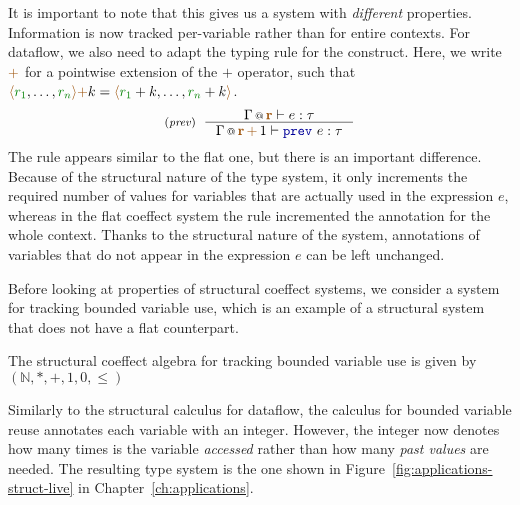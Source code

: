 It is important to note that this gives us a system with \emph{different} properties.
Information is now tracked per-variable rather than for entire contexts. For dataflow,
we also need to adapt the typing rule for the  construct. Here, we write $\aclrd{+}$
for a pointwise extension of the $+$ operator, such that
$\alift{\cclrd{r_1}, \ldots, \cclrd{r_n}} \aclrd{+} k = \alift{\cclrd{r_1} + k, \ldots, \cclrd{r_n} + k}$.
%
\begin{equation*}
\tyrule{prev}
  { \coctx{\Gamma}{\aclrd{\textbf{r}}} \vdash e : \tau }
  { \coctx{\Gamma}{\aclrd{\textbf{r}} \,\aclrd{+}\, 1} \vdash \kvd{prev}~e : \tau }
\end{equation*}
%
The rule appears similar to the flat one, but there is an important difference. Because of the
structural nature of the type system, it only increments the required number of values for
variables that are actually used in the expression $e$, whereas in the flat coeffect system the rule
incremented the annotation for the whole context. Thanks to the structural nature of the system,
annotations of variables that do not appear in the expression $e$ can be left unchanged.

Before looking at properties of structural coeffect systems,
we consider a system for tracking bounded variable use, which is an example of a structural system
that does not have a flat counterpart.

\begin{example}
\label{ex:structural-ex-bll}
The structural coeffect algebra for tracking bounded variable use is given by
$(\mathbb{N}, \ast, +, 1, 0, \leq)$
\end{example}

\noindent
Similarly to the structural calculus for dataflow, the calculus for bounded variable reuse
annotates each variable with an integer. However, the integer now denotes how many times is the variable
\emph{accessed} rather than how many \emph{past values} are needed. The resulting type system is
the one shown in Figure~\ref{fig:applications-struct-live} in Chapter~\ref{ch:applications}.



%
%


